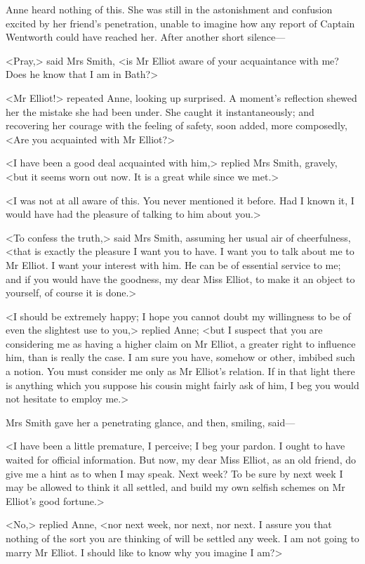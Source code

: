 Anne heard nothing of this. She was still in the astonishment and confusion excited by her friend's penetration, unable to imagine how any report of Captain Wentworth could have reached her. After another short silence—

<Pray,> said Mrs Smith, <is Mr Elliot aware of your acquaintance with me? Does he know that I am in Bath?>

<Mr Elliot!> repeated Anne, looking up surprised. A moment's reflection shewed her the mistake she had been under. She caught it instantaneously; and recovering her courage with the feeling of safety, soon added, more composedly, <Are you acquainted with Mr Elliot?>

<I have been a good deal acquainted with him,> replied Mrs Smith, gravely, <but it seems worn out now. It is a great while since we met.>

<I was not at all aware of this. You never mentioned it before. Had I known it, I would have had the pleasure of talking to him about you.>

<To confess the truth,> said Mrs Smith, assuming her usual air of cheerfulness, <that is exactly the pleasure I want you to have. I want you to talk about me to Mr Elliot. I want your interest with him. He can be of essential service to me; and if you would have the goodness, my dear Miss Elliot, to make it an object to yourself, of course it is done.>

<I should be extremely happy; I hope you cannot doubt my willingness to be of even the slightest use to you,> replied Anne; <but I suspect that you are considering me as having a higher claim on Mr Elliot, a greater right to influence him, than is really the case. I am sure you have, somehow or other, imbibed such a notion. You must consider me only as Mr Elliot's relation. If in that light there is anything which you suppose his cousin might fairly ask of him, I beg you would not hesitate to employ me.>

Mrs Smith gave her a penetrating glance, and then, smiling, said—

<I have been a little premature, I perceive; I beg your pardon. I ought to have waited for official information. But now, my dear Miss Elliot, as an old friend, do give me a hint as to when I may speak. Next week? To be sure by next week I may be allowed to think it all settled, and build my own selfish schemes on Mr Elliot's good fortune.>

<No,> replied Anne, <nor next week, nor next, nor next. I assure you that nothing of the sort you are thinking of will be settled any week. I am not going to marry Mr Elliot. I should like to know why you imagine I am?>

